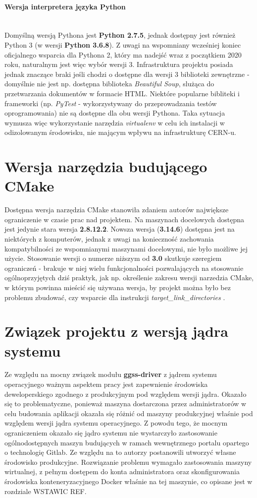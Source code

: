 \paragraph*{Wersja interpretera języka Python}\mbox{}\\
Domyślną wersją Pythona jest \textbf{Python 2.7.5}, jednak dostępny jest również Python 3 (w wersji \textbf{Python 3.6.8}). Z uwagi na wspomniany wcześniej koniec oficjalnego wsparcia dla Pythona 2, który ma nadejść wraz z początkiem 2020 roku, naturalnym jest więc wybór wersji 3. Infrastruktura projektu posiada jednak znaczące braki jeśli chodzi o dostępne dla wersji 3 biblioteki zewnętrzne - domyślnie nie jest np. dostępna biblioteka \textit{Beautiful Soup}, slużąca do przetwarzania dokumentów w formacie HTML. Niektóre popularne bibliteki i frameworki (np. \textit{PyTest} - wykorzystywany do przeprowadzania testów oprogramowania) nie są dostępne dla obu wersji Pythona. Taka sytuacja wymusza więc wykorzystanie narzędzia \textit{virtualenv} w celu ich instalacji w odizolowanym środowisku, nie mającym wpływu na infrastrukturę CERN-u.

\section{Wersja narzędzia budującego CMake}
Dostępna wersja narzędzia CMake stanowiła zdaniem autorów największe ograniczenie w czasie prac nad projektem. Na maszynach docelowych dostępna jest jedynie stara wersja \textbf{2.8.12.2}. Nowsza wersja (\textbf{3.14.6}) dostępna jest na niektórych z komputerów, jednak z uwagi na konieczność zachowania kompatybilności ze wspomnianymi maszynami docelowymi, nie było możliwe jej użycie. Stosowanie wersji o numerze niższym od \textbf{3.0} skutkuje szeregiem ograniczeń - brakuje w niej wielu funkcjonalności pozwalających na stosowanie ogólnoprzyjętych dziś praktyk, jak np. określenie zakresu wersji narzedzia CMake, w którym powinna mieścić się używana wersja, by projekt można było bez problemu zbudować, czy wsparcie dla instrukcji \textit{target\_link\_directories} \cite{NewInCMake}.

\section{Związek projektu z wersją jądra systemu}
Ze względu na mocny związek modułu \textbf{ggss-driver} z jądrem systemu operacyjnego ważnym aspektem pracy jest zapewnienie środowiska deweloperskiego zgodnego z produkcyjnym pod względem wersji jądra. Okazało się to problematyczne, ponieważ maszyna dostarczona przez administratorów w celu budowania aplikacji okazała się różnić od maszyny produkcyjnej właśnie pod względem wersji jądra systemu operacyjnego. Z powodu tego, że mocnym ograniczeniem okazało się jądro systemu nie wystarczyło zastosowanie ogólnodostępnych maszyn budujących w ramach wewnętrznego portalu opartego o technologię Gitlab. Ze względu na to autorzy postanowili utworzyć własne środowisko produkcyjne. Rozwiązanie problemu wymagało zastosowania maszyny wirtualnej, z pełnym dostępem do konta administratora oraz skonfigurowania środowiska konteneryzacyjnego Docker właśnie na tej maszynie, co opisane jest w rozdziale WSTAWIC REF.


